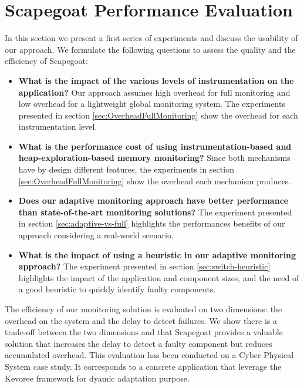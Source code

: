 \section{Scapegoat Performance Evaluation\label{sec:evaluation}}

In this section we present a first series of experiments and discuss the usability of our approach.
We formulate the following questions to assess the quality and the efficiency of Scapegoat:

\begin{itemize}
	\item \textbf{What is the impact of the various levels of instrumentation on the application?}
	Our approach assumes high overhead for full monitoring and low overhead for a lightweight global monitoring system. The experiments presented in section \ref{sec:OverheadFullMonitoring} show the overhead for each instrumentation level.
	\item \textbf{What is the performance cost of using instrumentation-based and heap-exploration-based memory monitoring?}
	Since both mechanisms have by design different features, the experiments in section \ref{sec:OverheadFullMonitoring} show the overhead each mechanism produces. 
	\item \textbf{Does our adaptive monitoring approach have better performance than state-of-the-art monitoring solutions?}
	The experiment presented in section \ref{sec:adaptive-vs-full} highlights the performances benefits of our approach considering a real-world scenario.
	\item \textbf{What is the impact of using a heuristic in our adaptive monitoring approach?}
	The experiment presented in section \ref{sec:switch-heuristic} highlights the impact of the application and component sizes, and the need of a good heuristic to quickly identify faulty components.
\end{itemize}

The efficiency of our monitoring solution is evaluated on two dimensions: the overhead on the system and the delay to detect failures.
We show there is a trade-off between the two dimensions and that Scapegoat provides a valuable solution that increases the delay to detect a faulty component but reduces accumulated overhead.
This evaluation has been conducted on a Cyber Physical System case study.
It corresponds to a concrete application that leverage the Kevoree framework for dyamic adaptation purpose.

